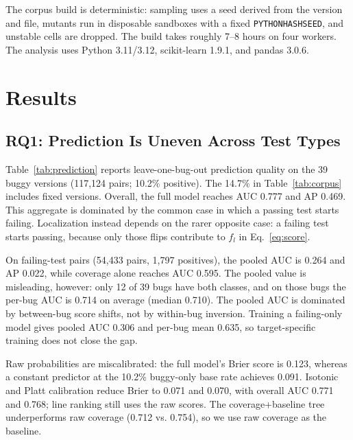 \documentclass[10pt,conference]{IEEEtran}
\begin{document}
The corpus build is deterministic: sampling uses a seed derived from the version and file, mutants run in disposable sandboxes with a fixed \texttt{PYTHONHASHSEED}, and unstable cells are dropped. The build takes roughly 7--8 hours on four workers. The analysis uses Python 3.11/3.12, scikit-learn 1.9.1, and pandas 3.0.6.

\section{Results}
\label{sec:results}

\subsection{RQ1: Prediction Is Uneven Across Test Types}

Table~\ref{tab:prediction} reports leave-one-bug-out prediction quality on the 39 buggy versions (117,124 pairs; 10.2\% positive). The 14.7\% in Table~\ref{tab:corpus} includes fixed versions. Overall, the full model reaches AUC 0.777 and AP 0.469. This aggregate is dominated by the common case in which a passing test starts failing. Localization instead depends on the rarer opposite case: a failing test starts passing, because only those flips contribute to $f_l$ in Eq.~\eqref{eq:score}.

On failing-test pairs (54,433 pairs, 1,797 positives), the pooled AUC is 0.264 and AP 0.022, while coverage alone reaches AUC 0.595. The pooled value is misleading, however: only 12 of 39 bugs have both classes, and on those bugs the per-bug AUC is 0.714 on average (median 0.710). The pooled AUC is dominated by between-bug score shifts, not by within-bug inversion. Training a failing-only model gives pooled AUC 0.306 and per-bug mean 0.635, so target-specific training does not close the gap.

Raw probabilities are miscalibrated: the full model's Brier score is 0.123, whereas a constant predictor at the 10.2\% buggy-only base rate achieves 0.091. Isotonic and Platt calibration reduce Brier to 0.071 and 0.070, with overall AUC 0.771 and 0.768; line ranking still uses the raw scores. The coverage+baseline tree underperforms raw coverage (0.712 vs. 0.754), so we use raw coverage as the baseline.
\end{document}
